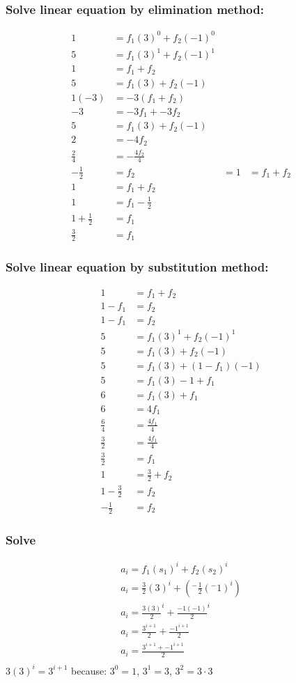 \documentclass{article}
\begin{document}
\subsubsection{Solve linear equation by elimination method:}
\begin{align*}
1 & = f_1(3)^0 + f_2(-1)^0 \\
5 & = f_1(3)^1 + f_2(-1)^1 \\
1 & = f_1 + f_2 \\
5 & = f_1(3) + f_2(-1) \\
1(-3) & = -3(f_1 + f_2) \\
-3 &= -3f_1 + -3f_2 \\
5 & = f_1(3) + f_2(-1) \\
2 &= -4f_2 \\
\frac{2}{4} &= -\frac{4f_2}{4} \\
-\frac{1}{2} &= f_2
 &= 1 & = f_1 + f_2 \\
1 & = f_1 + f_2 \\
1 & = f_1 - \frac{1}{2} \\
1 + \frac{1}{2} & = f_1 \\
\frac{3}{2} &= f_1
\end{align*}

\subsubsection{Solve linear equation by substitution method:}
\begin{align*}
1 & = f_1 + f_2 \\
1 - f_1 & = f_2 \\
1 - f_1 &= f_2 \\
5 & = f_1(3)^1 + f_2(-1)^1 \\
5 & = f_1(3) + f_2(-1) \\
5 & = f_1(3) + (1 - f_1)(-1) \\
5 & = f_1(3) - 1 + f_1 \\
6 & = f_1(3) + f_1 \\
6 & = 4f_1 \\
\frac{6}{4} & = \frac{4f_1}{4} \\
\frac{3}{2} & = \frac{4f_1}{4} \\
\frac{3}{2} & = f_1 \\
1 & = \frac{3}{2} + f_2 \\
1 - \frac{3}{2} & =  f_2 \\
-\frac{1}{2} &= f_2
\end{align*}
\subsubsection{Solve}
\begin{align*}
a_i = f_1(s_1)^i + f_2(s_2)^i \\
a_i = \frac{3}{2}(3)^i + (^-\frac{1}{2}(^-1)^i) \\
a_i = \frac{3(3)}{2}^i + \frac{-1(-1)}{2}^i \\
a_i = \frac{3^{i+1}}{2} + \frac{-1^{i+1}}{2} \\
a_i = \frac{3^{i+1} + -1^{i+1}}{2} \\
\end{align*}
$3(3)^i = 3^{i+1}$ because: $3^0 = 1$, $3^1 = 3$, $3^2 = 3 \cdot 3$
\end{document}
